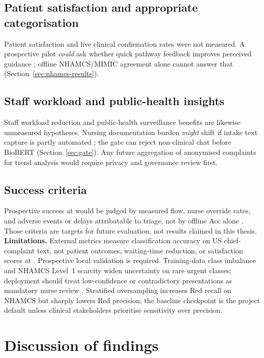 \subsection{Patient satisfaction and appropriate categorisation}

Patient satisfaction and live clinical confirmation rates were not measured. A prospective pilot \emph{could} ask whether quick pathway feedback improves perceived guidance \citep{stewart2023nlp}; offline NHAMCS/MIMIC agreement alone cannot answer that (Section~\ref{sec:nhamcs-results}).

\subsection{Staff workload and public-health insights}

Staff workload reduction and public-health surveillance benefits are likewise unmeasured hypotheses. Nursing documentation burden \emph{might} shift if intake text capture is partly automated \citep{stewart2023nlp,Mitchell2023}; the gate can reject non-clinical chat before BioBERT (Section~\ref{sec:gate}). Any future aggregation of anonymised complaints for trend analysis would require privacy and governance review first.

\subsection{Success criteria}

Prospective success at \examplehospital{} would be judged by measured flow, nurse override rates, and adverse events or delays attributable to triage, not by offline Acc alone \citep{Rominski2014,kathsats}. Those criteria are targets for future evaluation, not results claimed in this thesis.
\textbf{Limitations.} External metrics measure classification accuracy on US chief-complaint text, not patient outcomes, waiting-time reduction, or satisfaction scores at \examplehospital{} \citep{Mitchell2023,Nurchis2025}. Prospective local validation is required. Training-data class imbalance and NHAMCS Level~1 scarcity widen uncertainty on rare urgent classes; deployment should treat low-confidence or contradictory presentations as mandatory nurse review \citep{Berkowitz2019,satsmanual}. Stratified oversampling increases Red recall on NHAMCS but sharply lowers Red precision; the baseline checkpoint is the project default unless clinical stakeholders prioritise sensitivity over precision.

\section{Discussion of findings}
\label{sec:discussion}

